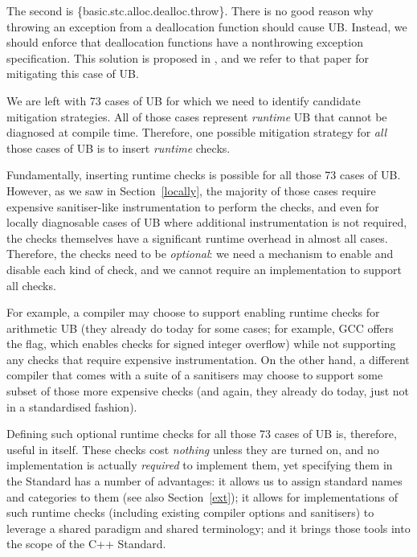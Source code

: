 The second is \{basic.stc.alloc.dealloc.throw\}. There is no good reason why throwing an exception from a deallocation function should cause UB. Instead, we should enforce that deallocation functions have a nonthrowing exception specification. This solution is proposed in \cite{P3424R0}, and we refer to that paper for mitigating this case of UB.

We are left with 73 %
cases of UB for which we need to identify candidate mitigation strategies. All of those cases represent \emph{runtime} UB that cannot be diagnosed at compile time. Therefore, one possible mitigation strategy for \emph{all} those cases of UB is to insert \emph{runtime} checks.

Fundamentally, inserting runtime checks is possible for all those 73 cases of UB. However, as we saw in Section~\ref{locally}, the majority of those cases require expensive sanitiser-like instrumentation to perform the checks, and even for locally diagnosable cases of UB where additional instrumentation is not required, the checks themselves have a significant runtime overhead in almost all cases. Therefore, the checks need to be \emph{optional}: we need a mechanism to enable and disable each kind of check, and we cannot require an implementation to support all checks.

For example, a compiler may choose to support enabling runtime checks for arithmetic UB (they already do today for some cases; for example, GCC offers the  flag, which enables checks for signed integer overflow) while not supporting any checks that require expensive instrumentation. On the other hand, a different compiler that comes with a suite of a sanitisers may choose to support some subset of those more expensive checks (and again, they already do today, just not in a standardised fashion).

Defining such optional runtime checks for all those 73 cases of UB is, therefore, useful in itself. These checks cost \emph{nothing} unless they are turned on, and no implementation is actually \emph{required} to implement them, yet specifying them in the Standard has a number of advantages: it allows us to assign standard names and categories to them (see also Section~\ref{ext}); it allows for implementations of such runtime checks (including existing compiler options and sanitisers) to leverage a shared paradigm and shared terminology; and it brings those tools into the scope of the C++ Standard.

